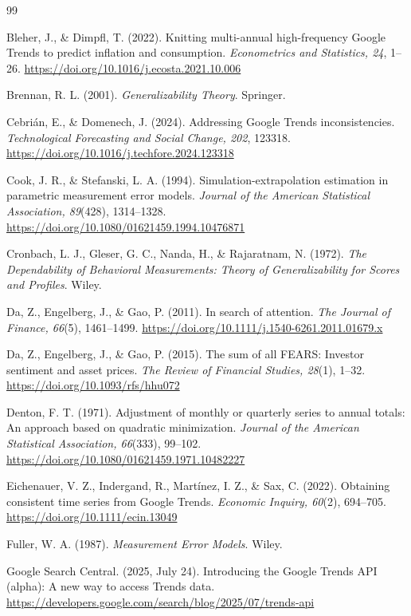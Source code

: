 \documentclass[12pt,a4paper,oneside]{article}
\begin{document}
\begin{thebibliography}{99}

Bleher, J., \& Dimpfl, T. (2022).
Knitting multi-annual high-frequency Google Trends to predict inflation and consumption.
\textit{Econometrics and Statistics, 24}, 1--26.
\url{https://doi.org/10.1016/j.ecosta.2021.10.006}

Brennan, R. L. (2001).
\textit{Generalizability Theory}.
Springer.

Cebrián, E., \& Domenech, J. (2024).
Addressing Google Trends inconsistencies.
\textit{Technological Forecasting and Social Change, 202}, 123318.
\url{https://doi.org/10.1016/j.techfore.2024.123318}

Cook, J. R., \& Stefanski, L. A. (1994).
Simulation-extrapolation estimation in parametric measurement error models.
\textit{Journal of the American Statistical Association, 89}(428), 1314--1328.
\url{https://doi.org/10.1080/01621459.1994.10476871}

Cronbach, L. J., Gleser, G. C., Nanda, H., \& Rajaratnam, N. (1972).
\textit{The Dependability of Behavioral Measurements: Theory of Generalizability for Scores and Profiles}.
Wiley.

Da, Z., Engelberg, J., \& Gao, P. (2011).
In search of attention.
\textit{The Journal of Finance, 66}(5), 1461--1499.
\url{https://doi.org/10.1111/j.1540-6261.2011.01679.x}

Da, Z., Engelberg, J., \& Gao, P. (2015).
The sum of all FEARS: Investor sentiment and asset prices.
\textit{The Review of Financial Studies, 28}(1), 1--32.
\url{https://doi.org/10.1093/rfs/hhu072}

Denton, F. T. (1971).
Adjustment of monthly or quarterly series to annual totals: An approach based on quadratic minimization.
\textit{Journal of the American Statistical Association, 66}(333), 99--102.
\url{https://doi.org/10.1080/01621459.1971.10482227}

Eichenauer, V. Z., Indergand, R., Martínez, I. Z., \& Sax, C. (2022).
Obtaining consistent time series from Google Trends.
\textit{Economic Inquiry, 60}(2), 694--705.
\url{https://doi.org/10.1111/ecin.13049}

Fuller, W. A. (1987).
\textit{Measurement Error Models}.
Wiley.

Google Search Central. (2025, July 24).
Introducing the Google Trends API (alpha): A new way to access Trends data.
\url{https://developers.google.com/search/blog/2025/07/trends-api}


\end{thebibliography}
\end{document}
